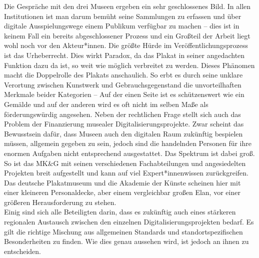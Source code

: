 \documentclass[a4paper,12pt,ngerman]{article}
\begin{document}
Die Gespräche mit den drei Museen ergeben ein sehr geschlossenes Bild. In allen Institutionen ist man darum bemüht seine Sammlungen zu erfassen und über digitale Ausspielungswege einem Publikum verfügbar zu machen -- dies ist in keinem Fall ein bereits abgeschlossener Prozess und ein Großteil der Arbeit liegt wohl noch vor den Akteur*innen. Die größte Hürde im Veröffentlichungsprozess ist das Urheberrecht. Dies wirkt Paradox, da das Plakat in seiner angedachten Funktion dazu da ist, so weit wie möglich verbreitet zu werden. Dieses Phänomen macht die Doppelrolle des Plakats anschaulich. So erbt es durch seine unklare Verortung zwischen Kunstwerk und Gebrauchsgegenstand die unvorteilhaften Merkmale beider Kategorien -- Auf der einen Seite ist es schützenswert wie ein Gemälde und auf der anderen wird es oft nicht im selben Maße als förderungswürdig angesehen. Neben der rechtlichen Frage stellt sich auch das Problem der Finanzierung musealer Digitalisierungsprojekte. Zwar scheint das Bewusstsein dafür, dass Museen auch den digitalen Raum zukünftig bespielen müssen, allgemein gegeben zu sein, jedoch sind die handelnden Personen für ihre enormen Aufgaben nicht entsprechend ausgestattet. Das Spektrum ist dabei groß. So ist das MK\&G mit seinen verschiedenen Fachabteilungen und angesiedelten Projekten breit aufgestellt und kann auf viel Expert*innenwissen zurückgreifen. Das deutsche Plakatmuseum und die Akademie der Künste scheinen hier mit einer kleineren Personaldecke, aber einem vergleichbar großen Elan, vor einer größeren Herausforderung zu stehen. \\
Einig sind sich alle Beteiligten darin, dass es zukünftig auch eines stärkeren regionalen Austausch zwischen den einzelnen Digitalisierungsprojekten bedarf. Es gilt die richtige Mischung aus allgemeinen Standards und standortspezifischen Besonderheiten zu finden. Wie dies genau aussehen wird, ist jedoch an ihnen zu entscheiden. \\

\newpage
\end{document}
